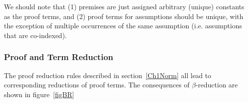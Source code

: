 We should note that (1) premises are just assigned arbitrary (unique)
constants as the proof terms, and (2) proof terms for assumptions
should be unique, with the exception of multiple occurrences of the
same assumption (i.e. assumptions that are co-indexed).

\subsubsection{Proof and Term Reduction}

The proof reduction rules described in section~\ref{Ch1Norm} all lead to 
corresponding reductions of proof terms. The consequences of
$\beta$-reduction are shown in figure~\ref{figBR}
\begin{figure}
\begin{center}
\end{center}
\end{figure}
